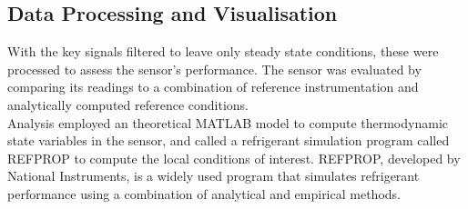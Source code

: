 \documentclass{report}
\begin{document}
\subsection{Data Processing and Visualisation}
With the key signals filtered to leave only steady state conditions, these were processed to assess the sensor's performance. The sensor was evaluated by comparing its readings to a combination of reference instrumentation and analytically computed reference conditions. \\
Analysis employed an theoretical MATLAB model to compute thermodynamic state variables in the sensor, and called a refrigerant simulation program called REFPROP to compute the local conditions of interest. %
REFPROP, developed by National Instruments, is a widely used program that simulates refrigerant performance using a combination of analytical and empirical methods. %
\end{document}
